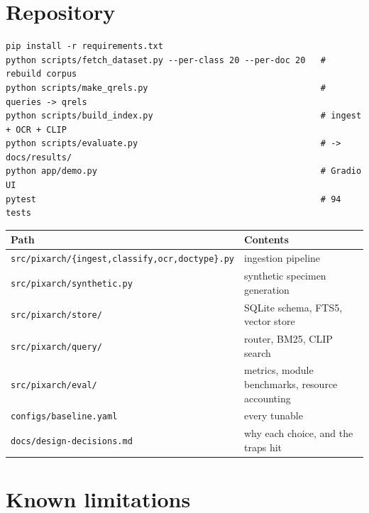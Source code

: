 \documentclass[11pt,a4paper]{article}
\newcommand{\code}[1]{\texttt{\small #1}}
\begin{document}
\section{Repository}

\begin{Verbatim}[fontsize=\small,frame=single,framesep=6pt,rulecolor=\color{rulegrey}]
pip install -r requirements.txt
python scripts/fetch_dataset.py --per-class 20 --per-doc 20   # rebuild corpus
python scripts/make_qrels.py                                  # queries -> qrels
python scripts/build_index.py                                 # ingest + OCR + CLIP
python scripts/evaluate.py                                    # -> docs/results/
python app/demo.py                                            # Gradio UI
pytest                                                        # 94 tests
\end{Verbatim}

\begin{center}
\begin{tabular}{@{}p{7.1cm}p{7.9cm}@{}}
\toprule
\textbf{Path} & \textbf{Contents} \\
\midrule
\code{src/pixarch/\{ingest,\allowbreak classify,\allowbreak ocr,\allowbreak doctype\}.py} & ingestion pipeline \\
\code{src/pixarch/synthetic.py}  & synthetic specimen generation \\
\code{src/pixarch/store/}        & SQLite schema, FTS5, vector store \\
\code{src/pixarch/query/}        & router, BM25, CLIP search \\
\code{src/pixarch/eval/}         & metrics, module benchmarks, resource accounting \\
\code{configs/baseline.yaml}     & every tunable \\
\code{docs/design-decisions.md}  & why each choice, and the traps hit \\
\bottomrule
\end{tabular}
\end{center}

\section{Known limitations}
\end{document}
